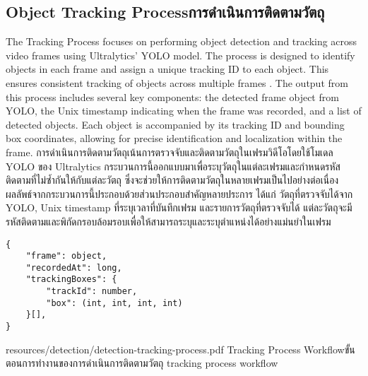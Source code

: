 \subsection{\ifenglish Object Tracking Process\else การดำเนินการติดตามวัตถุ\fi}
\ifenglish
The Tracking Process focuses on performing object detection and tracking across video frames using Ultralytics' YOLO model. The process is designed to identify objects in each frame and assign a unique tracking ID to each object. This ensures consistent tracking of objects across multiple frames \cite{ultralytics-track}. The output from this process includes several key components: the detected frame object from YOLO, the Unix timestamp indicating when the frame was recorded, and a list of detected objects. Each object is accompanied by its tracking ID and bounding box coordinates, allowing for precise identification and localization within the frame.
\else
การดำเนินการติดตามวัตถุเน้นการตรวจจับและติดตามวัตถุในเฟรมวิดีโอโดยใช้โมเดล YOLO ของ Ultralytics กระบวนการนี้ออกแบบมาเพื่อระบุวัตถุในแต่ละเฟรมและกำหนดรหัสติดตามที่ไม่ซ้ำกันให้กับแต่ละวัตถุ ซึ่งจะช่วยให้การติดตามวัตถุในหลายเฟรมเป็นไปอย่างต่อเนื่อง \cite{ultralytics-track} ผลลัพธ์จากกระบวนการนี้ประกอบด้วยส่วนประกอบสำคัญหลายประการ ได้แก่ วัตถุที่ตรวจจับได้จาก YOLO, Unix timestamp ที่ระบุเวลาที่บันทึกเฟรม และรายการวัตถุที่ตรวจจับได้ แต่ละวัตถุจะมีรหัสติดตามและพิกัดกรอบล้อมรอบเพื่อให้สามารถระบุและระบุตำแหน่งได้อย่างแม่นยำในเฟรม
\fi
\begin{lstlisting}
{
    "frame": object,
    "recordedAt": long,
    "trackingBoxes": {
        "trackId": number, 
        "box": (int, int, int, int) 
    }[],
}
\end{lstlisting}

\insertPDFfigure
{resources/detection/detection-tracking-process.pdf}
{\ifenglish Tracking Process Workflow\else ขั้นตอนการทำงานของการดำเนินการติดตามวัตถุ\fi}
{tracking process workflow}